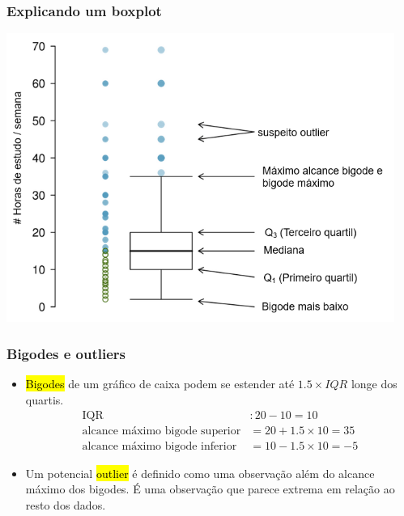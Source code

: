 \begin{frame}
\frametitle{Explicando um boxplot}

\begin{center}
\includegraphics[width=0.95\textwidth]{1-6_numerical_data/study_hours_box_layout.png}
\end{center}

\end{frame}


\begin{frame}[fragile]
\frametitle{Bigodes e outliers}

\begin{itemize}
\justifying
\item \hl{Bigodes} de um gráfico de caixa podem se estender até $1.5 \times IQR$ longe dos quartis.\\
\pause
\vspace{-0.5cm}
{\small
\begin{align*}
\text{IQR}&: 20 - 10 = 10 \\
\text{alcance~máximo~bigode~superior}&= 20 + 1.5 \times 10 = 35 \\
\text{alcance~máximo~bigode~inferior}&= 10 - 1.5 \times 10 = -5
\end{align*}
}

\pause
\vspace{-0.25cm}
\justifying
\item Um potencial \hl{outlier} é definido como uma observação além do alcance máximo dos bigodes. É uma observação que parece extrema em relação ao resto dos dados.

\end{itemize}

\end{frame}

